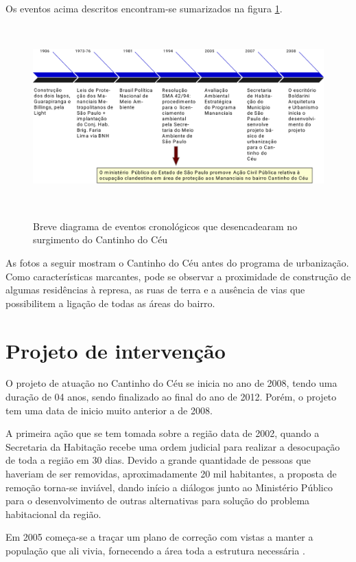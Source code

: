	Os eventos acima descritos encontram-se sumarizados na figura \ref*{fig:cronologia}.
	
	\begin{figure}[H]
		\centering
		\caption[Cronologia do surgimento do Cantinho do Céu]{Breve diagrama de eventos cronológicos que desencadearam no surgimento do Cantinho do Céu}
		\includegraphics[height=7cm]{img/cronologia}
		\label{fig:cronologia}
	\end{figure}
	
	As fotos a seguir mostram o Cantinho do Céu antes do programa de urbanização. Como características marcantes, pode se observar a proximidade de construção de algumas residências à represa, as ruas de terra e a ausência de vias que possibilitem a ligação de todas as áreas do bairro.
	
	\chapter{Projeto de intervenção}
	O projeto de atuação no Cantinho do Céu se inicia no ano de 2008, tendo uma duração de 04 anos, sendo finalizado ao final do ano de 2012. Porém, o projeto tem uma data de inicio muito anterior a de 2008. 
	
	A primeira ação que se tem tomada sobre a região data de 2002, quando a Secretaria da Habitação recebe uma ordem judicial para realizar a desocupação de toda a região em 30 dias. Devido a grande quantidade de pessoas que haveriam de ser removidas, aproximadamente 20 mil habitantes, a proposta de remoção torna-se inviável, dando início a diálogos junto ao Ministério Público para o desenvolvimento de outras alternativas para solução do problema habitacional da região.
	
	Em 2005 começa-se a traçar um plano de correção com vistas a manter a população que ali vivia, fornecendo a área toda a estrutura necessária \cite{Barda2012}.
	
